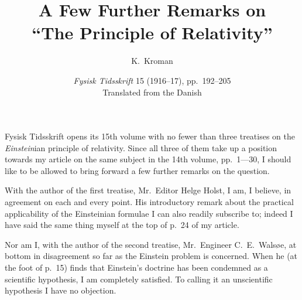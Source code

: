 \documentclass[12pt,a4paper]{article}
\title{\textbf{\textbf{A Few Further Remarks on}\\[2pt]``The Principle of Relativity''}}
\author{K.\ Kroman}
\date{\textit{Fysisk Tidsskrift} 15 (1916--17), pp.~192--205\\[2pt]
\small Translated from the Danish}
\begin{document}
\maketitle

Fysisk Tidsskrift opens its 15th volume with no fewer than three treatises on
the \emph{Einstein}ian principle of relativity. Since all three of them take
up a position towards my article on the same subject in the 14th volume,
pp.~1---30, I should like to be allowed to bring forward a few further remarks
on the question.

With the author of the first treatise, Mr.\ Editor Helge Holst, I am, I
believe, in agreement on each and every point. His introductory remark about
the practical applicability of the Einsteinian formulae I can also readily
subscribe to; indeed I have said the same thing myself at the top of p.\ 24 of
my article.

Nor am I, with the author of the second treatise, Mr.\ Engineer
C.\ E.\ Walsøe, at bottom in disagreement so far as the Einstein problem is
concerned. When he (at the foot of p.\ 15) finds that Einstein's doctrine has
been condemned as a scientific hypothesis, I am completely satisfied. To
calling it an unscientific hypothesis I have no objection.
\end{document}
